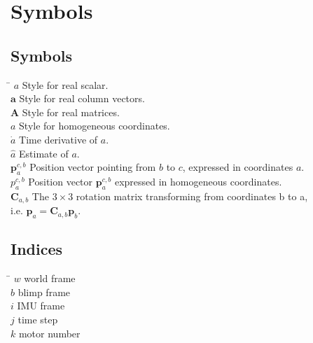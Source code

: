 \chapter*{Symbols}
\label{sec:symbols}

\section*{Symbols}

\begin{tabbing}
 \hspace*{3cm} \= \kill
  $a$                     \> Style for real scalar. \\[0.5ex]
  $\mathbf{a}$            \> Style for real column vectors. \\[0.5ex]
  $\mathbf{A}$            \> Style for real matrices. \\[0.5ex]
  $\mathbf{\textit{a}}$   \> Style for homogeneous coordinates. \\[0.5ex]
  $\dot{a}$               \> Time derivative of $a$. \\[0.5ex]
  $\hat{a}$               \> Estimate of $a$. \\[0.5ex]
  $\mathbf{p}^{c,b}_a$    \> Position vector pointing from $b$ to $c$, expressed in coordinates $a$. \\[0.5ex]
  $\mathbf{\textit{p}}^{c,b}_a$    \> Position vector $\mathbf{p}^{c,b}_a$ expressed in homogeneous coordinates. \\[0.5ex]
  $\mathbf{C}_{a,b}$      \> The $3\times3$ rotation matrix transforming from coordinates b to a, \\ \> i.e. $\mathbf{p}_a=\mathbf{C}_{a,b}\mathbf{p}_b$. \\[0.5ex]

\end{tabbing}

\section*{Indices}

\begin{tabbing}
 \hspace*{1.6cm}  \= \kill
 $w$ \> world frame \\[0.5ex]
 $b$ \> blimp frame \\[0.5ex]
 $i$ \> IMU frame \\[0.5ex]
 $j$ \> time step \\[0.5ex]
 $k$ \> motor number \\[0.5ex]
\end{tabbing}

